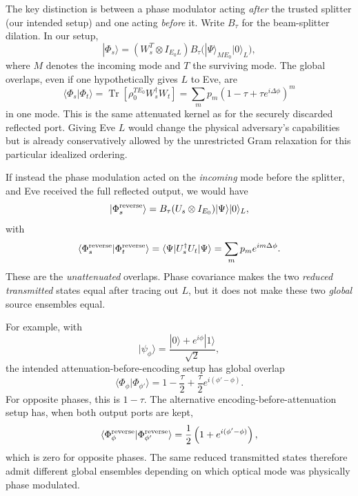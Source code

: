 \documentclass[11pt]{article}
\theoremstyle{remark}
\begin{document}
The key distinction is between a phase modulator acting \emph{after} the
trusted splitter (our intended setup) and one acting \emph{before} it.
Write \(B_\tau\) for the beam-splitter dilation.  In our setup,
\[
    |\Phi_s\rangle
    =
    (W_s^T\otimes I_{E_0L})
    B_\tau\bigl(|\Psi\rangle_{ME_0}|0\rangle_L\bigr),
\]
where \(M\) denotes the incoming mode and \(T\) the surviving mode.
The global overlaps, even if one hypothetically gives \(L\) to Eve, are
\begin{equation}
    \langle\Phi_s|\Phi_t\rangle
    =
    \operatorname{Tr}
    \left[
      \rho_0^{TE_0}W_s^\dagger W_t
    \right]
    =
    \sum_m p_m
    \left(1-\tau+\tau e^{i\Delta\phi}\right)^m
    \label{eq:app-virtual-purifier-overlap}
\end{equation}
in one mode.  This is the same attenuated kernel as for the securely
discarded reflected port.  Giving Eve \(L\) would change the physical
adversary's capabilities but is already conservatively allowed by the
unrestricted Gram relaxation for this particular idealized ordering.

If instead the phase modulation acted on the \emph{incoming} mode before
the splitter, and Eve received the full reflected output, we would have
\[
    |\Phi_s^{\rm reverse}\rangle
    =
    B_\tau(U_s\otimes I_{E_0})|\Psi\rangle|0\rangle_L,
\]
with
\begin{equation}
    \langle\Phi_s^{\rm reverse}|\Phi_t^{\rm reverse}\rangle
    =
    \langle\Psi|U_s^\dagger U_t|\Psi\rangle
    =
    \sum_m p_m e^{im\Delta\phi}.
    \label{eq:app-physical-loss-port-overlap}
\end{equation}
These are the \emph{unattenuated} overlaps.  Phase covariance makes the
two \emph{reduced transmitted} states equal after tracing out \(L\), but
it does not make these two \emph{global} source ensembles equal.

For example, with
\[
    |\psi_\phi\rangle
    =
    \frac{|0\rangle+e^{i\phi}|1\rangle}{\sqrt2},
\]
the intended attenuation-before-encoding setup has global overlap
\[
    \langle\Phi_\phi|\Phi_{\phi'}\rangle
    =
    1-\frac{\tau}{2}
    +
    \frac{\tau}{2}e^{i(\phi'-\phi)}.
\]
For opposite phases, this is \(1-\tau\).  The alternative
encoding-before-attenuation setup has, when both output ports are kept,
\[
    \langle\Phi_\phi^{\rm reverse}|
       \Phi_{\phi'}^{\rm reverse}\rangle
    =
    \frac12\left(1+e^{i(\phi'-\phi)}\right),
\]
which is zero for opposite phases.  The same reduced transmitted states
therefore admit different global ensembles depending on which optical
mode was physically phase modulated.
\end{document}
